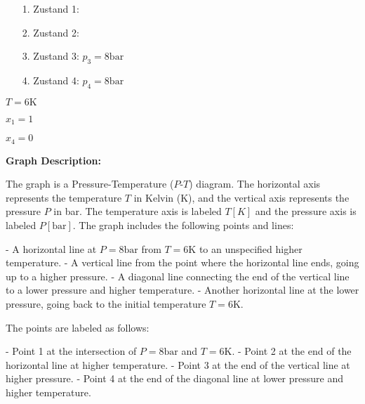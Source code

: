 

\item[a)] 
    \begin{itemize}
        \item[1.] Zustand 1:
        \item[2.] Zustand 2:
        \item[3.] Zustand 3: \( p_3 = 8 \text{bar} \)
        \item[4.] Zustand 4: \( p_4 = 8 \text{bar} \)
    \end{itemize}
    
    \( T = 6 \text{K} \)
    
    \( x_1 = 1 \)
    
    \( x_4 = 0 \)
    
    \textbf{Graph Description:}
    
    The graph is a Pressure-Temperature (\( P \)-\( T \)) diagram. The horizontal axis represents the temperature \( T \) in Kelvin (K), and the vertical axis represents the pressure \( P \) in bar. The temperature axis is labeled \( T [K] \) and the pressure axis is labeled \( P [\text{bar}] \). The graph includes the following points and lines:
    
    - A horizontal line at \( P = 8 \text{bar} \) from \( T = 6 \text{K} \) to an unspecified higher temperature.
    - A vertical line from the point where the horizontal line ends, going up to a higher pressure.
    - A diagonal line connecting the end of the vertical line to a lower pressure and higher temperature.
    - Another horizontal line at the lower pressure, going back to the initial temperature \( T = 6 \text{K} \).
    
    The points are labeled as follows:
    
    - Point 1 at the intersection of \( P = 8 \text{bar} \) and \( T = 6 \text{K} \).
    - Point 2 at the end of the horizontal line at higher temperature.
    - Point 3 at the end of the vertical line at higher pressure.
    - Point 4 at the end of the diagonal line at lower pressure and higher temperature.